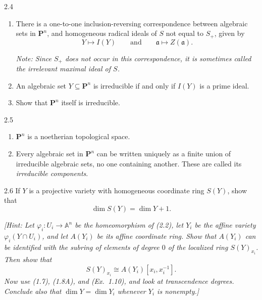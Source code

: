 \documentclass[12pt]{article}
\begin{document}
\begin{problem}{2.4}
\begin{enumerate}
    \item[(a)] There is a one-to-one inclusion-reversing correspondence between algebraic sets in $\mathbf P^n$, and homogeneous radical ideals of $S$ not equal to $S_+$, given by
    \[
    Y\longmapsto I(Y)
    \qquad\text{and}\qquad
    \mathfrak a\longmapsto Z(\mathfrak a).
    \]

    \emph{Note: Since $S_+$ does not occur in this correspondence, it is sometimes called the irrelevant maximal ideal of $S$.}

    \item[(b)] An algebraic set $Y\subseteq \mathbf P^n$ is irreducible if and only if $I(Y)$ is a prime ideal.

    \item[(c)] Show that $\mathbf P^n$ itself is irreducible.
\end{enumerate}
\end{problem}

\begin{problem}{2.5}
\begin{enumerate}
    \item[(a)] $\mathbf P^n$ is a noetherian topological space.

    \item[(b)] Every algebraic set in $\mathbf P^n$ can be written uniquely as a finite union of irreducible algebraic sets, no one containing another. These are called its \emph{irreducible components}.
\end{enumerate}
\end{problem}

\begin{problem}{2.6}
If $Y$ is a projective variety with homogeneous coordinate ring $S(Y)$, show that
\[
\dim S(Y)=\dim Y+1.
\]

\emph{[Hint: Let $\varphi_i:U_i\to \mathbb A^n$ be the homeomorphism of (2.2), let $Y_i$ be the affine variety $\varphi_i(Y\cap U_i)$, and let $A(Y_i)$ be its affine coordinate ring. Show that $A(Y_i)$ can be identified with the subring of elements of degree $0$ of the localized ring $S(Y)_{x_i}$. Then show that}
\[
S(Y)_{x_i}\cong A(Y_i)[x_i,x_i^{-1}].
\]
\emph{Now use (1.7), (1.8A), and (Ex.\ 1.10), and look at transcendence degrees. Conclude also that $\dim Y=\dim Y_i$ whenever $Y_i$ is nonempty.]}
\end{problem}
\end{document}
